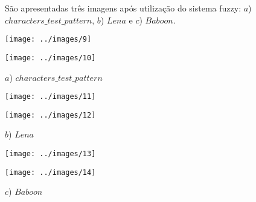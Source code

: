 \documentclass[conference]{IEEEtran}
\begin{document}
		\vspace{2\baselineskip}\vspace{-\parskip}
	
S\~ao apresentadas tr\^es imagens ap\'os utiliza\c{c}\~ao do sistema fuzzy: $a$) $characters\_test\_pattern$, $b$) $Lena$ e $c$) $Baboon$.
		\vspace{2\baselineskip}\vspace{-\parskip}
		\\
		

		\begin{minipage}{\linewidth}
  		\centering
  		\texttt{[image: ../images/9]}
		\end{minipage}				


		\begin{minipage}{\linewidth}
  		\centering
  		\texttt{[image: ../images/10]}
		\end{minipage}	
 		
 		$a$) $characters\_test\_pattern$
 		
 		
 		
		\begin{minipage}{\linewidth}
  		\centering
  		\texttt{[image: ../images/11]}
		\end{minipage}				

		\begin{minipage}{\linewidth}
  		\centering
  		\texttt{[image: ../images/12]}
		\end{minipage}	

		$b$) $Lena$
		
 	
		\begin{minipage}{\linewidth}
  		\centering
  		\texttt{[image: ../images/13]}
		\end{minipage}				

		\vspace{2\baselineskip}\vspace{-\parskip}
		\vspace{2\baselineskip}\vspace{-\parskip}
		\begin{minipage}{\linewidth}
  		\centering
  		\texttt{[image: ../images/14]}
		\end{minipage}	
		
		\vspace{2\baselineskip}\vspace{-\parskip}
		\vspace{2\baselineskip}\vspace{-\parskip}
		\vspace{2\baselineskip}\vspace{-\parskip}			
 		$c$) $Baboon$		
	
\end{document}
